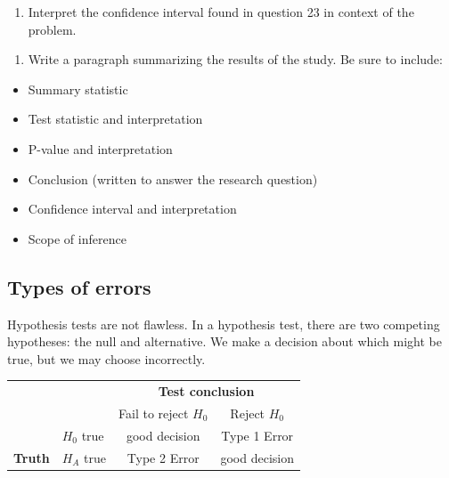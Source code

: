\documentclass[
]{report}
\providecommand{\tightlist}{%
  \setlength{\itemsep}{0pt}\setlength{\parskip}{0pt}}
\begin{document}
\vspace{1in}

\begin{enumerate}
\def\labelenumi{\arabic{enumi}.}
\setcounter{enumi}{23}
\tightlist
\item
  Interpret the confidence interval found in question 23 in context of the problem.
\end{enumerate}

\vspace{1in}

\begin{enumerate}
\def\labelenumi{\arabic{enumi}.}
\setcounter{enumi}{24}
\tightlist
\item
  Write a paragraph summarizing the results of the study. Be sure to include:
\end{enumerate}

\begin{itemize}
\item
  Summary statistic
\item
  Test statistic and interpretation
\item
  P-value and interpretation
\item
  Conclusion (written to answer the research question)
\item
  Confidence interval and interpretation
\item
  Scope of inference
\end{itemize}

\vspace{.5in}

\hypertarget{types-of-errors}{%
\subsection*{Types of errors}\label{types-of-errors}}

Hypothesis tests are not flawless. In a hypothesis test, there are two competing hypotheses: the null and alternative. We make a decision about which might be true, but we may choose incorrectly.

\begin{table}
\centering
\begin{tabular}[h]{ll|cc}
\hline
 & &  \multicolumn{2}{c}{\textbf{Test conclusion}} \\
 &  & \multicolumn{1}{c}{Fail to reject $H_0$} & \multicolumn{1}{c}{Reject $H_0$}\\
\hline
 & $H_0$ true & good decision & Type 1 Error\\
\hline
\textbf{Truth} & $H_A$ true & Type 2 Error & good decision\\
\hline
\end{tabular}
\end{table}
\end{document}
